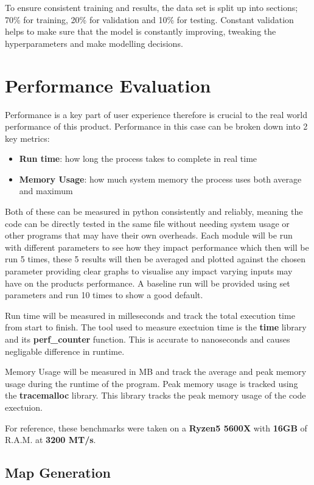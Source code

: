 \documentclass[final]{cmpreport_02}
\begin{document}
To ensure consistent training and results, the data set is split up into sections; 70\% for training, 20\% for validation and 10\% for testing.
Constant validation helps to make sure that the model is constantly improving, tweaking the hyperparameters and make modelling decisions.
\section{Performance Evaluation}
Performance is a key part of user experience therefore is crucial to the real world performance of this product.
Performance in this case can be broken down into 2 key metrics:

\begin{itemize}
	\item{\textbf{Run time}: how long the process takes to complete in real time}
	\item{\textbf{Memory Usage}: how much system memory the process uses both average and maximum}
\end{itemize}

Both of these can be measured in python consistently and reliably, meaning the code can be directly tested in the same file without needing system usage or other programs that may have their own overheads.
Each module will be run with different parameters to see how they impact performance which then will be run 5 times,
these 5 results will then be averaged and plotted against the chosen parameter providing clear graphs to visualise any impact varying inputs may have on the products performance.
A baseline run will be provided using set parameters and run 10 times to show a good default.

Run time will be measured in milleseconds and track the total execution time from start to finish.
The tool used to measure exectuion time  is the \textbf{time} library and its \textbf{perf\_counter} function.
This is accurate to nanoseconds and causes negligable difference in runtime.

Memory Usage will be measured in MB and track the average and peak memory usage during the runtime of the program.
Peak memory usage is tracked using the \textbf{tracemalloc} library.
This library tracks the peak memory usage of the code exectuion.

For reference, these benchmarks were taken on a \textbf{Ryzen5 5600X} with \textbf{16GB} of R.A.M. at \textbf{3200 MT/s}.

\subsection{Map Generation}
\end{document}

